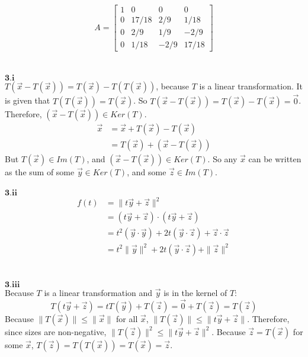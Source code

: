 \documentclass[letterpaper,12pt]{article}
\begin{document}
\begin{equation*}
A =
\begin{bmatrix}
1 & 0 & 0 & 0 \\
0 & 17/18 & 2/9 & 1/18 \\
0 & 2/9 & 1/9 & -2/9 \\
0 & 1/18 & -2/9 & 17/18
\end{bmatrix}
\end{equation*}
\\
\\$\mathbf{3.i}$
\\ $T(\vec{x} - T(\vec{x})) = T(\vec{x}) - T(T(\vec{x}))$, because $T$ is a linear transformation.
It is given that $T(T(\vec{x})) = T(\vec{x})$.
So $T(\vec{x} - T(\vec{x})) = T(\vec{x}) - T(\vec{x}) = \vec{0}$. Therefore,
$(\vec{x} - T(\vec{x})) \in Ker(T)$.
\begin{align*}
\vec{x} &= \vec{x} + T(\vec{x}) - T(\vec{x}) \\ & =
T(\vec{x}) + (\vec{x} - T(\vec{x}))
\end{align*}
But $T(\vec{x}) \in Im(T)$, and $(\vec{x} - T(\vec{x})) \in Ker(T)$.
So any $\vec{x}$ can be written as the sum of some $\vec{y} \in Ker(T)$, and some $\vec{z} \in Im(T)$.
\\
\\$\mathbf{3.ii}$
\\
\begin{align*}
f(t) & = \| t \vec{y} + \vec{z} \|^2
\\ & = (t \vec{y} + \vec{z}) \cdot (t \vec{y} + \vec{z})
\\ & = t^2 (\vec{y} \cdot \vec{y}) + 2t (\vec{y} \cdot \vec{z}) + \vec{z} \cdot \vec{z}
\\ & = t^2 \| \vec{y} \|^2 + 2t (\vec{y} \cdot \vec{z}) + \| \vec{z} \|^2
\end{align*}
\\
\\$\mathbf{3.iii}$
\\
Because $T$ is a linear transformation and $\vec{y}$ is in the kernel of $T$:
\begin{equation*}
T(t \vec{y} + \vec{z}) = t T(\vec{y}) + T(\vec{z}) = \vec{0} + T(\vec{z}) = T(\vec{z})
\end{equation*}
Because $\| T(  \vec{x} ) \| \leq \| \vec{x} \|$ for all $\vec{x}$, $\| T(  \vec{z} ) \| \leq \| t \vec{y} + \vec{z} \|$.
Therefore, since sizes are non-negative, $\| T(  \vec{z} ) \|^2 \leq \| t \vec{y} + \vec{z} \|^2$.
Because $\vec{z} = T(\vec{x})$ for some $\vec{x}$, $T(\vec{z}) = T(T(\vec{x})) = T(\vec{x}) = \vec{z}$.
\end{document}
